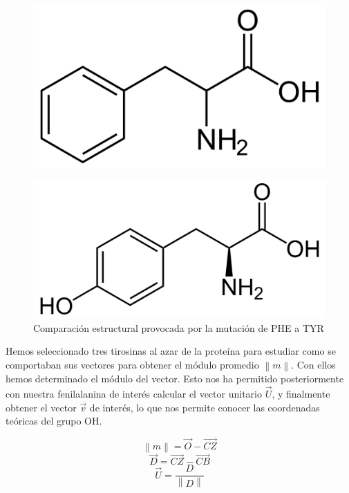\documentclass[12pt]{article}
\begin{document}
\begin{figure}[H]
\centering
\includegraphics[scale=0.2]{fe}
\end{figure}
\begin{figure}[H]
\centering
\includegraphics[scale=0.25]{ti}
\caption{Comparación estructural provocada por la mutación de PHE a TYR}
\end{figure}

Hemos seleccionado tres tirosinas al azar de la proteína para estudiar como se comportaban sus vectores para obtener el módulo promedio $\left\| m \right\|$. Con ellos hemos determinado el módulo del vector. Esto nos ha permitido posteriormente con nuestra fenilalanina de interés calcular el vector unitario $\overrightarrow{U}$, y finalmente obtener el vector $\overrightarrow{v}$ de interés, lo que nos permite conocer las coordenadas teóricas del grupo OH.
\newline

\begin{equation}
\left\| m \right\|=\overrightarrow{O}- \overrightarrow{CZ}
\end{equation}
\begin{equation}
\overrightarrow{D}=\overrightarrow{CZ}- \overrightarrow{CB}
\end{equation}
\begin{equation}
\overrightarrow{U}=\frac{D}{\left\| D \right\|}
\end{equation}
\end{document}
